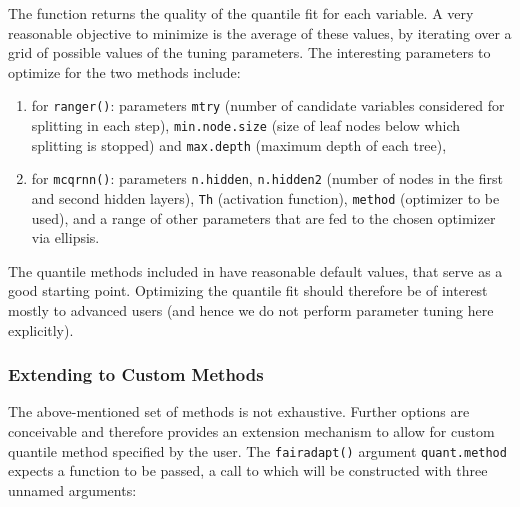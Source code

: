 \documentclass[
  nojss]{jss}
\providecommand{\tightlist}{%
  \setlength{\itemsep}{0pt}\setlength{\parskip}{0pt}}
\begin{document}
The function returns the quality of the quantile fit for each variable.
A very reasonable objective to minimize is the average of these values,
by iterating over a grid of possible values of the tuning parameters.
The interesting parameters to optimize for the two methods include:

\begin{enumerate}
\def\labelenumi{(\roman{enumi})}
\tightlist
\item
  for \texttt{ranger()}: parameters \texttt{mtry} (number of candidate
  variables considered for splitting in each step),
  \texttt{min.node.size} (size of leaf nodes below which splitting is
  stopped) and \texttt{max.depth} (maximum depth of each tree),
\item
  for \texttt{mcqrnn()}: parameters \texttt{n.hidden},
  \texttt{n.hidden2} (number of nodes in the first and second hidden
  layers), \texttt{Th} (activation function), \texttt{method} (optimizer
  to be used), and a range of other parameters that are fed to the
  chosen optimizer via ellipsis.
\end{enumerate}

The quantile methods included in  have reasonable default
values, that serve as a good starting point. Optimizing the quantile fit
should therefore be of interest mostly to advanced users (and hence we
do not perform parameter tuning here explicitly).

\hypertarget{extending-to-custom-methods}{%
\subsubsection{Extending to Custom
Methods}\label{extending-to-custom-methods}}

The above-mentioned set of methods is not exhaustive. Further options
are conceivable and therefore  provides an extension
mechanism to allow for custom quantile method specified by the user. The
\texttt{fairadapt()} argument \texttt{quant.method} expects a function
to be passed, a call to which will be constructed with three unnamed
arguments:
\end{document}
